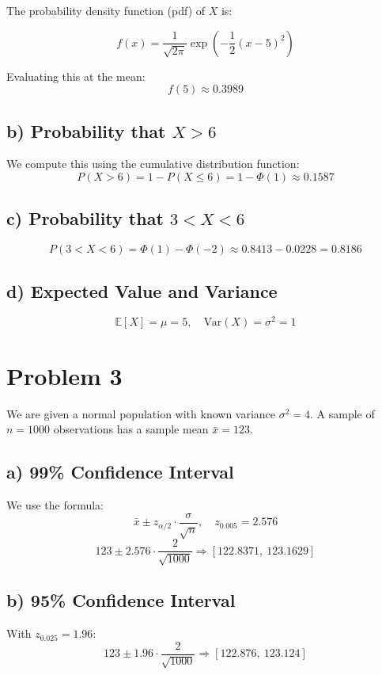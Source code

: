 \documentclass[12pt]{article}
\begin{document}
The probability density function (pdf) of $X$ is:

\[
f(x) = \frac{1}{\sqrt{2\pi}} \exp\left(-\frac{1}{2}(x - 5)^2\right)
\]

Evaluating this at the mean:
\[
f(5) \approx 0.3989
\]

\subsection*{b) Probability that $X > 6$}

We compute this using the cumulative distribution function:
\[
P(X > 6) = 1 - P(X \leq 6) = 1 - \Phi(1) \approx 0.1587
\]

\subsection*{c) Probability that $3 < X < 6$}

\[
P(3 < X < 6) = \Phi(1) - \Phi(-2) \approx 0.8413 - 0.0228 = 0.8186
\]

\subsection*{d) Expected Value and Variance}

\[
\mathbb{E}[X] = \mu = 5, \quad \text{Var}(X) = \sigma^2 = 1
\]


\section*{Problem 3}

We are given a normal population with known variance $\sigma^2 = 4$. A sample of $n = 1000$ observations has a sample mean $\bar{x} = 123$.

\subsection*{a) 99\% Confidence Interval}

We use the formula:
\[
\bar{x} \pm z_{\alpha/2} \cdot \frac{\sigma}{\sqrt{n}}, \quad z_{0.005} = 2.576
\]
\[
123 \pm 2.576 \cdot \frac{2}{\sqrt{1000}} \Rightarrow [122.8371,\ 123.1629]
\]

\subsection*{b) 95\% Confidence Interval}

With $z_{0.025} = 1.96$:
\[
123 \pm 1.96 \cdot \frac{2}{\sqrt{1000}} \Rightarrow [122.876,\ 123.124]
\]
\end{document}
